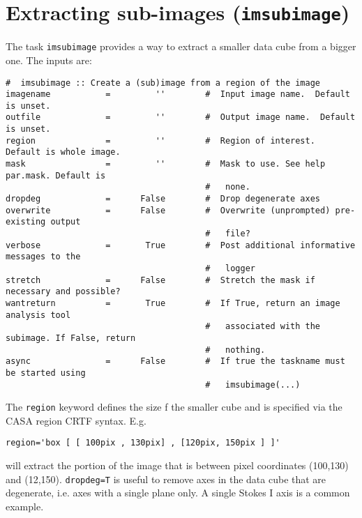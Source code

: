 \section{Extracting sub-images ({\tt imsubimage})}
\label{section:analysis.imsubimage}

The task {\tt imsubimage} provides a way to extract a smaller data
cube from a bigger one. The inputs are: 

\small
\begin{verbatim}
#  imsubimage :: Create a (sub)image from a region of the image
imagename           =         ''        #  Input image name.  Default is unset.
outfile             =         ''        #  Output image name.  Default is unset.
region              =         ''        #  Region of interest.  Default is whole image.
mask                =         ''        #  Mask to use. See help par.mask. Default is
                                        #   none.
dropdeg             =      False        #  Drop degenerate axes
overwrite           =      False        #  Overwrite (unprompted) pre-existing output
                                        #   file?
verbose             =       True        #  Post additional informative messages to the
                                        #   logger
stretch             =      False        #  Stretch the mask if necessary and possible?
wantreturn          =       True        #  If True, return an image analysis tool
                                        #   associated with the subimage. If False, return
                                        #   nothing.
async               =      False        #  If true the taskname must be started using
                                        #   imsubimage(...)
\end{verbatim}
\normalsize 

The {\tt region} keyword defines the size f the smaller cube and is
specified via the CASA region CRTF syntax.  E.g.

\small
\begin{verbatim}
region='box [ [ 100pix , 130pix] , [120pix, 150pix ] ]'
\end{verbatim}
\normalsize

will extract the portion of the image that is between pixel
coordinates (100,130) and (12,150). {\tt dropdeg=T} is useful to remove
axes in the data cube that are degenerate, i.e. axes with a single
plane only. A single Stokes I axis is a common example.


